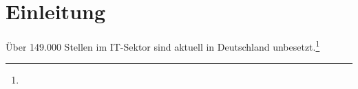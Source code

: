 \documentclass{subfiles}
\begin{document}
\chapter{Einleitung}\label{ch:intro}

Über 149.000 Stellen im IT-Sektor sind aktuell in Deutschland unbesetzt.\footnote{}
\end{document}
